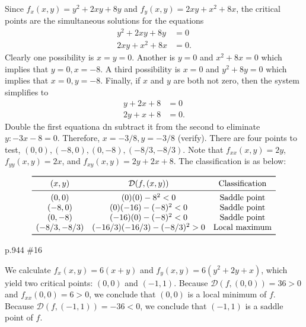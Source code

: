\begin{pracsol}
  Since $f_x(x,y)=y^2+2xy+8y$ and $f_y(x,y)=2xy+x^2+8x$, the critical points are the simultaneous solutions for the equations
  \begin{align*}
    y^2+2xy+8y&=0\\
    2xy+x^2+8x&=0.
  \end{align*}
  Clearly one possibility is $x=y=0$. Another is $y=0$ and $x^2+8x=0$ which implies that $y=0,x=-8$. A third possibility is $x=0$ and $y^2+8y=0$ which implies that $x=0,y=-8$. Finally, if $x$ and $y$ are both not zero, then the system simplifies to
  \begin{align*}
    y+2x+8 &=0\\
    2y+x+8 &= 0.
  \end{align*}
  Double the first equationa dn subtract it from the second to eliminate $y:-3x-8=0$. Therefore, $x=-3/8,y=-3/8$ (verify). There are four points to test, $(0,0),(-8,0),(0,-8),(-8/3,-8/3)$. Note that $f_{xx}(x,y)=2y$, $f_{yy}(x,y)=2x$, and $f_{xy}(x,y)=2y+2x+8$. The classification is as below:
  \begin{center}
    \[\begin{array}{ccc}
      \toprule
      (x,y) & \mathcal D(f,(x,y)) & \text{Classification}\\
      \midrule
      (0,0) & (0)(0)-8^2<0 & \text{Saddle point}\\
      (-8,0) & (0)(-16)-(-8)^2<0 & \text{Saddle point}\\
      (0,-8) & (-16)(0) - (-8)^2<0 & \text{Saddle point}\\
      (-8/3,-8/3) & (-16/3)(-16/3)-(-8/3)^2>0 & \text{Local maximum}\\
      \bottomrule
    \end{array}\]
  \end{center}
\end{pracsol}
\begin{practice}p.944 \#16\end{practice}
\begin{pracsol}
  We calculate $f_x(x,y)=6(x+y)$ and $f_y(x,y)=6(y^2+2y+x)$, which yield two critical points: $(0,0)$ and $(-1,1)$. Because $\mathcal D(f,(0,0))=36>0$ and $f_{xx}(0,0)=6>0$, we conclude that $(0,0)$ is a local minimum of $f$. Because $\mathcal D(f,(-1,1))=-36<0$, we conclude that $(-1,1)$ is a saddle point of $f$.
\end{pracsol}

